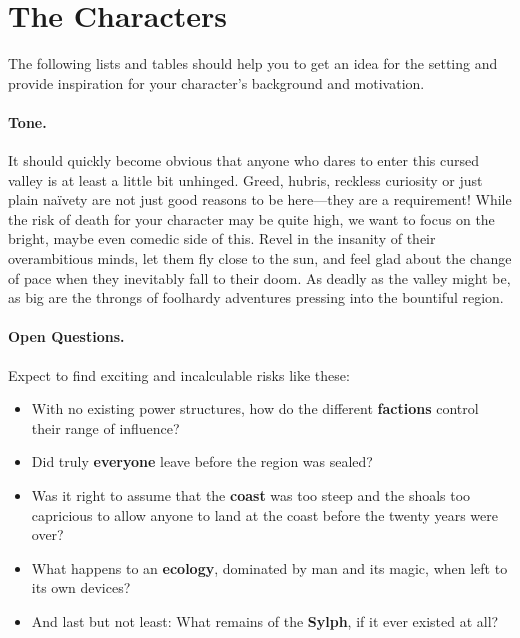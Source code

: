 \documentclass{zine}
\begin{document}
\fleurontri


\section{The Characters}\label{_characters}

The following lists and tables should help you to get an idea for the
setting and provide inspiration for your character's background and
motivation.

\paragraph{Tone.} It should quickly become obvious that anyone who dares to enter this
cursed valley is at least a little bit unhinged. Greed, hubris, reckless
curiosity or just plain naïvety are not just good reasons to be
here---they are a requirement! While the risk of death for your
character may be quite high, we want to focus on the bright, maybe even
comedic side of this.
Revel in the insanity of their overambitious minds, let them fly close to the sun, and feel glad about the change of pace when they inevitably fall to their doom.
As deadly as the valley
might be, as big are the throngs of foolhardy adventures pressing into
the bountiful region.

\pagebreak

\paragraph{Open Questions.}
Expect to find exciting and incalculable risks like these:

\begin{itemize}
	\item
	      With no existing power structures, how do the different
	      \textbf{factions} control their range of influence?
	\item
	      Did truly \textbf{everyone} leave before the region was sealed?
	\item
	      Was it right to assume that the \textbf{coast} was too steep and the
	      shoals too capricious to allow anyone to land at the coast before the
	      twenty years were over?
	\item
	      What happens to an \textbf{ecology}, dominated by man and its magic,
	      when left to its own devices?
	\item
	      And last but not least: What remains of the \textbf{Sylph}, if it ever
	      existed at all?
\end{itemize}
\end{document}
